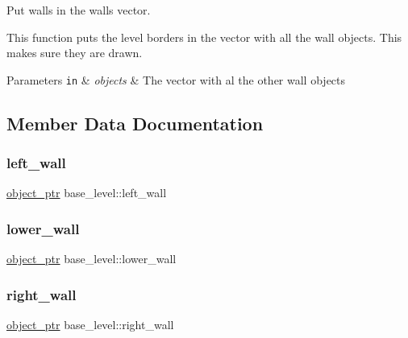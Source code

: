 Put walls in the walls vector. 

This function puts the level borders in the vector with all the wall objects. This makes sure they are drawn. 
\begin{DoxyParams}[1]{Parameters}
\mbox{\tt in}  & {\em objects} & The vector with al the other wall objects \\
\hline
\end{DoxyParams}


\subsection{Member Data Documentation}
\mbox{\label{classbase__level_a29e885695d2a043bdab849dcb73c5c8e}} 
\subsubsection{\texorpdfstring{left\+\_\+wall}{left\_wall}}
{\footnotesize\ttfamily \hyperlink{drawable_8hpp_aab5add95f06d2ba25dbfed8eb07274fa}{object\+\_\+ptr} base\+\_\+level\+::left\+\_\+wall\hspace{0.3cm}{\ttfamily [private]}}

\mbox{\label{classbase__level_a196474637fdc953f4f2ed088ace891f7}} 
\subsubsection{\texorpdfstring{lower\+\_\+wall}{lower\_wall}}
{\footnotesize\ttfamily \hyperlink{drawable_8hpp_aab5add95f06d2ba25dbfed8eb07274fa}{object\+\_\+ptr} base\+\_\+level\+::lower\+\_\+wall\hspace{0.3cm}{\ttfamily [private]}}

\mbox{\label{classbase__level_a4a1f6a57a83aec4bd0b82072ab21df43}} 
\subsubsection{\texorpdfstring{right\+\_\+wall}{right\_wall}}
{\footnotesize\ttfamily \hyperlink{drawable_8hpp_aab5add95f06d2ba25dbfed8eb07274fa}{object\+\_\+ptr} base\+\_\+level\+::right\+\_\+wall\hspace{0.3cm}{\ttfamily [private]}}

